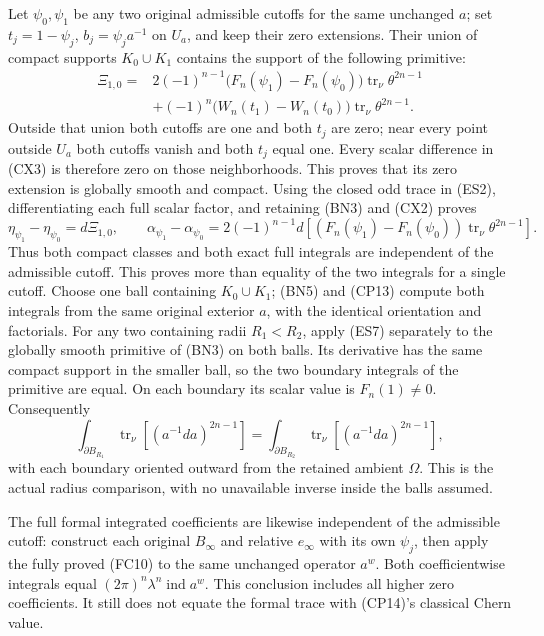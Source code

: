 \documentclass[
  11pt,
]{article}
\begin{document}
Let \(\psi_0,\psi_1\) be any two original admissible cutoffs for the
same unchanged \(a\); set \(t_j=1-\psi_j\), \(b_j=\psi_j a^{-1}\) on
\(U_a\), and keep their zero extensions. Their union of compact supports
\(K_0\cup K_1\) contains the support of the following primitive: \[
 \begin{aligned}
 \Xi_{1,0}={}&
 2(-1)^{n-1}\bigl(F_n(\psi_1)-F_n(\psi_0)\bigr)
                         \operatorname{tr}_\nu\theta^{2n-1}\\
 &+(-1)^n\bigl(W_n(t_1)-W_n(t_0)\bigr)
                         \operatorname{tr}_\nu\theta^{2n-1}.
 \end{aligned}
 \tag{CX3}
\] Outside that union both cutoffs are one and both \(t_j\) are zero;
near every point outside \(U_a\) both cutoffs vanish and both \(t_j\)
equal one. Every scalar difference in (CX3) is therefore zero on those
neighborhoods. This proves that its zero extension is globally smooth
and compact. Using the closed odd trace in (ES2), differentiating each
full scalar factor, and retaining (BN3) and (CX2) proves \[
 \eta_{\psi_1}-\eta_{\psi_0}=d\Xi_{1,0},
 \qquad
 \alpha_{\psi_1}-\alpha_{\psi_0}
 =2(-1)^{n-1}d\!\left[
   (F_n(\psi_1)-F_n(\psi_0))
             \operatorname{tr}_\nu\theta^{2n-1}\right].
 \tag{CX4}
\] Thus both compact classes and both exact full integrals are
independent of the admissible cutoff. This proves more than equality of
the two integrals for a single cutoff. Choose one ball containing
\(K_0\cup K_1\); (BN5) and (CP13) compute both integrals from the same
original exterior \(a\), with the identical orientation and factorials.
For any two containing radii \(R_1<R_2\), apply (ES7) separately to the
globally smooth primitive of (BN3) on both balls. Its derivative has the
same compact support in the smaller ball, so the two boundary integrals
of the primitive are equal. On each boundary its scalar value is
\(F_n(1)\ne0\). Consequently \[
 \int_{\partial B_{R_1}}\operatorname{tr}_\nu[(a^{-1}da)^{2n-1}]
 =\int_{\partial B_{R_2}}\operatorname{tr}_\nu[(a^{-1}da)^{2n-1}],
 \tag{CX5}
\] with each boundary oriented outward from the retained ambient
\(\Omega\). This is the actual radius comparison, with no unavailable
inverse inside the balls assumed.

The full formal integrated coefficients are likewise independent of the
admissible cutoff: construct each original \(B_\infty\) and relative
\(e_\infty\) with its own \(\psi_j\), then apply the fully proved (FC10)
to the same unchanged operator \(a^w\). Both coefficientwise integrals
equal \((2\pi)^n\lambda^n\operatorname{ind}a^w\). This conclusion
includes all higher zero coefficients. It still does not equate the
formal trace with (CP14)'s classical Chern value.
\end{document}

